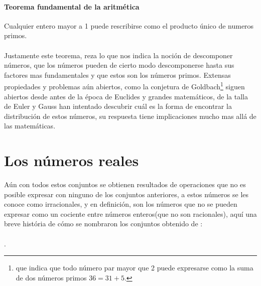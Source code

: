 \documentclass{article}
\begin{document}
\paragraph{Teorema fundamental de la aritmética} Cualquier entero mayor a 1 puede rescribirse como el producto único de numeros primos.

\paragraph{}
Justamente este teorema, reza lo que nos indica la noción de descomponer números, que los números pueden de cierto modo descomponerse hasta sus factores mas fundamentales y que estos son los números primos. Extensas propiedades y problemas aún abiertos, como la conjetura de Goldbach\footnote{que indica que todo número par mayor que 2 puede expresarse como la suma de dos números primos $36 = 31 + 5$.} siguen abiertos desde antes de la época de Euclides y grandes matemáticos, de la talla de Euler y Gauss han intentado descubrir cuál es la forma de encontrar la distribución de estos números, su respuesta tiene implicaciones mucho mas allá de las matemáticas.

\section{Los números reales}

Aún con todos estos conjuntos se obtienen resultados de operaciones que no es posible expresar con ninguno de los conjuntos anteriores, a estos números se les conoce como irracionales, y en definición, son los números que no se pueden expresar como un cociente entre números enteros(que no son racionales), aquí una breve história de cómo se nombraron los conjuntos obtenido de \cite{patino_duque_1977}:

\paragraph{}
.
\end{document}
